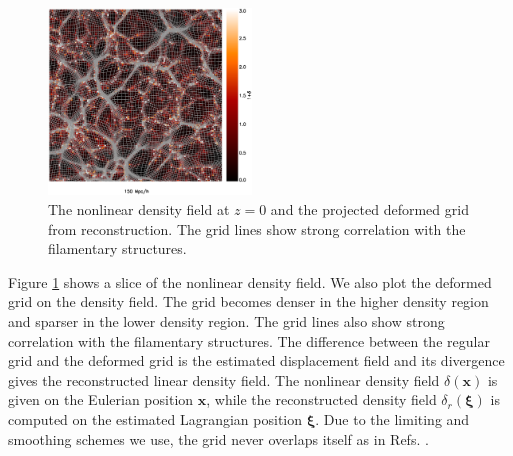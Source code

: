 \documentclass[aps,prl,twocolumn,showpacs,superscriptaddress,groupedaddress,nofootinbib]{revtex4}  %
\begin{document}
\begin{figure}[tbp]
\begin{center}
\includegraphics[width=0.48\textwidth]{map0512-0128_i1500.eps}
\end{center}
\vspace{-0.7cm}
\caption{The nonlinear density field at $z=0$ and the projected deformed grid 
from reconstruction. 
The grid lines show strong correlation with the filamentary structures.}
\label{fig:den}
\end{figure}

Figure \ref{fig:den} shows a slice of the nonlinear density field. 
We also plot the deformed grid on the density field. The grid becomes 
denser in the higher density region and sparser in the lower density region.
The grid lines also show strong correlation with the filamentary structures.
The difference between the regular grid and the deformed grid is the estimated
displacement field and its divergence gives the reconstructed linear density 
field. The nonlinear density field $\delta(\bm{x})$ is given on the Eulerian 
position $\bm{x}$, while the reconstructed density field $\delta_r(\bm{\xi})$ 
is computed on the estimated Lagrangian position $\bm{\xi}$. Due to the 
limiting and smoothing schemes we use, the grid never overlaps itself as in 
Refs. \cite{1995ApJS..100..269P,1998ApJS..115...19P}.
\end{document}
